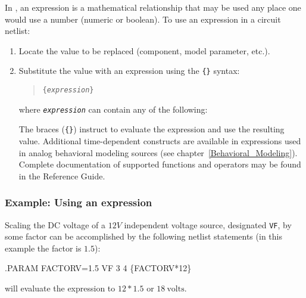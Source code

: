 In \Xyce{}, an expression is a mathematical relationship that may be
used any place one would use a number (numeric or boolean).  
To use an expression in a circuit netlist:
\begin{enumerate}
\item Locate the value to be replaced (component, model parameter, etc.).
\item Substitute the value with an expression using the \texttt{\{\}}
  syntax:
\begin{quote}
  \texttt{\{{\it expression\/}\}}%
\end{quote}
where \texttt{\it expression\/} can contain any of the
following:
The braces (\texttt{\{\}}) instruct \Xyce{} to evaluate the expression and use
the resulting value. Additional time-dependent constructs are available in expressions used in analog behavioral modeling sources (see chapter~\ref{Behavioral_Modeling}).    Complete documentation of supported functions and operators may be found in the \Xyce{} Reference Guide\ReferenceGuide{}.


\end{enumerate}

\subsubsection{Example:  Using an expression}
Scaling the DC voltage of a $12V$ independent voltage source, designated
\verb+VF+, by some factor can be accomplished by the following netlist
statements (in this example the factor is $1.5$):
\begin{vquote}
.PARAM FACTORV=1.5
VF 3 4 \{FACTORV*12\}
\end{vquote}
\Xyce{} will evaluate the expression to $12 * 1.5$ or $18\:\mbox{volts}$.



